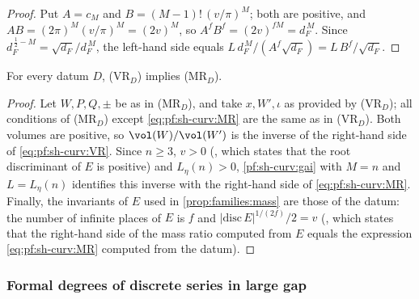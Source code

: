 \begin{proof}
Put $A=c_M$ and $B=(M-1)!\,(v/\pi)^M$; both are positive, and $AB=(2\pi)^M(v/\pi)^M=(2v)^M$, so
$A^fB^f=(2v)^{fM}=d_F^{\,M}$. Since $d_F^{\,\frac12-M}=\sqrt{d_F}/d_F^{\,M}$, the left-hand side equals
$L\,d_F^{\,M}/(A^f\sqrt{d_F})=L\,B^f/\sqrt{d_F}$.
\end{proof}

\begin{lemma}\label{pf:sh-curv:volmass}
For every datum $D$, \textup{(VR$_D$)} implies \textup{(MR$_D$)}.
\end{lemma}

\begin{proof}
Let $W,P,Q,\pm$ be as in (MR$_D$), and take $x,W',\iota$ as provided by (VR$_D$); all conditions of (MR$_D$) except
\eqref{eq:pf:sh-curv:MR} are the same as in (VR$_D$). Both volumes are positive, so
$\vol(W)/\vol(W')$ is the inverse of the right-hand side of \eqref{eq:pf:sh-curv:VR}. Since $n\ge3$, $v>0$
(, which states that the root discriminant of $E$ is positive)
and $L_\eta(n)>0$, \cref{pf:sh-curv:gai} with $M=n$ and $L=L_\eta(n)$ identifies this inverse with the right-hand side of
\eqref{eq:pf:sh-curv:MR}. Finally, the invariants of $E$ used in \cref{prop:families:mass} are those of the datum: the
number of infinite places of $E$ is $f$ and $|\mathrm{disc}\,E|^{1/(2f)}/2=v$
(, which states that the right-hand side of the mass ratio
computed from $E$ equals the expression \eqref{eq:pf:sh-curv:MR} computed from the datum).
\end{proof}

\subsubsection{Formal degrees of discrete series in large gap}

